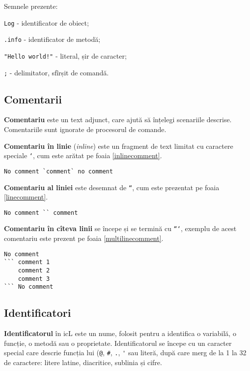 Semnele prezente:
\begin{icItems}
\item
	\lstinline|Log| - identificator de obiect;
\item
	\lstinline|.info| - identificator de metodă;
\item
	\lstinline|"Hello world!"| - literal, șir de caracter;
\item
	\lstinline|;| - delimitator, sfîrșit de comandă.
\end{icItems}

\subsection{Comentarii}

\textbf{Comentariu} este un text adjunct, care ajută să înțelegi scenariile descrise. Comentariile sunt ignorate de procesorul de comande.

\textbf{Comentariu în linie} (\textit{inline}) este un fragment de text limitat cu caractere speciale \texttt{`}, cum este arătat pe foaia \ref{inlinecomment}.

\begin{lstlisting}[caption=Comentariu în linie,label=inlinecomment]
No comment `comment` no comment
\end{lstlisting}

\textbf{Comentariu al liniei} este desemnat de \texttt{``}, cum este prezentat pe foaia \ref{linecomment}.

\begin{lstlisting}[caption=Comentariu al liniei,label=linecomment]
No comment `` comment
\end{lstlisting}

\textbf{Comentariu în cîteva linii} se începe și se termină cu \texttt{```}, exemplu de acest comentariu este prezent pe foaia \ref{multilinecomment}.

\begin{lstlisting}[caption=Comentariu în cîteva linii,label=multilinecomment]
No comment
``` comment 1
	comment 2
	comment 3
``` No comment
\end{lstlisting}

\subsection{Identificatori}

\textbf{Identificatorul} în icL este un nume, folosit pentru a identifica o variabilă, o funcție, o metodă sau o proprietate. Identificatorul se începe cu un caracter special care descrie funcția lui (\lstinline|@|, \lstinline|#|, \lstinline|.|, \lstinline|'| sau literă, după care merg de la 1 la 32 de caractere: litere latine, diacritice, sublinia și cifre.

